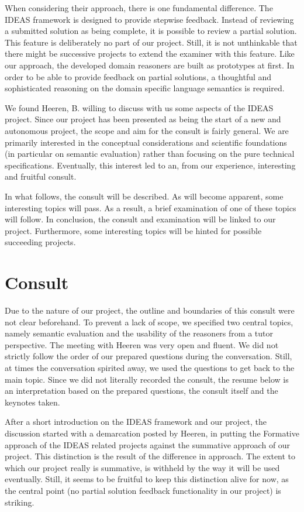When considering their approach, there is one fundamental difference. The IDEAS
framework is designed to provide stepwise feedback. Instead of reviewing a
submitted solution as being complete, it is possible to review a partial 
solution. This feature is deliberately no part of our project. Still, it is 
not unthinkable that there might be successive projects to extend the 
\gls{examiner} with this feature. Like our approach, the developed domain 
reasoners are built as prototypes at first. In order to be able to provide 
feedback on partial solutions, a thoughtful and sophisticated reasoning on the 
domain specific language semantics is required.


We found Heeren, B. willing to discuss with us some aspects of the IDEAS 
project. Since our project has been presented as being the start of a new and 
autonomous project, the scope and aim for the consult is fairly general. 
We are primarily interested in the conceptual considerations and scientific 
foundations (in particular on semantic evaluation) rather than focusing on the 
pure technical specifications. Eventually, this interest led to an, from our 
experience, interesting and fruitful consult. 


In what follows, the consult will be described. As will become apparent, some 
interesting topics will pass. As a result, a brief examination of one of these 
topics will follow. In conclusion, the consult and examination will be linked 
to our project. Furthermore, some interesting topics will be hinted for 
possible succeeding projects.


\section{Consult}
Due to the nature of our project, the outline and boundaries of this consult 
were not clear beforehand. To prevent a lack of scope, we specified two 
central topics, namely semantic evaluation and the usability of the reasoners 
from a tutor perspective. The meeting with Heeren was very open and fluent. We 
did not strictly follow the order of our prepared questions during the 
conversation. Still, at times the 
conversation spirited away, we used the questions to get back to the main 
topic. Since we did not literally recorded the consult, the resume below is an 
interpretation based on the prepared questions, the consult itself and the 
keynotes taken.

After a short introduction on the IDEAS framework and our project, the 
discussion started with a demarcation posted by Heeren, in putting the 
Formative approach of the IDEAS related projects against the summative 
approach of our project. This distinction is the result of the difference in 
approach. The extent to which our project really is summative, is withheld by 
the way it will be used eventually. %
Still, it seems to be fruitful to keep this distinction alive for now, as the 
central point (no partial solution feedback functionality in our project) is 
striking. 


